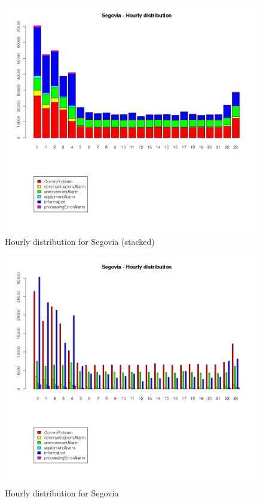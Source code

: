 \documentclass[a4paper,10pt]{article}
\begin{document}
\begin{figure}[h!]
 \centering
 \includegraphics[height=0.4\textheight]{./img/segovia_timeline.png}
 \caption{Hourly distribution for Segovia (stacked)}
\end{figure}
\begin{figure}[h!]
 \centering
 \includegraphics[height=0.4\textheight]{./img/segovia_timeline_b.png}
 \caption{Hourly distribution for Segovia}
\end{figure}
\end{document}
